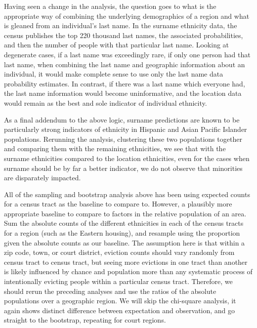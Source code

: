 \par Having seen a change in the analysis, the question goes to what is the appropriate way of combining the underlying demographics of a region and what is gleaned from an individual’s last name.  In the surname ethnicity data, the census publishes the top 220 thousand last names, the associated probabilities, and then the number of people with that particular last name.  Looking at degenerate cases, if a last name was exceedingly rare, if only one person had that last name, when combining the last name and geographic information about an individual, it would make complete sense to use only the last name data probability estimates.  In contrast, if there was a last name which everyone had, the last name information would become uninformative, and the location data would remain as the best and sole indicator of individual ethnicity.

\par As a final addendum to the above logic, surname predictions are known to be particularly strong indicators of ethnicity in Hispanic and Asian Pacific Islander populations.  Rerunning the analysis, clustering these two populations together and comparing them with the remaining ethnicities, we see that with the surname ethnicities compared to the location ethnicities, even for the cases when surname should be by far a better indicator, we do not observe that minorities are disparately impacted.

\par All of the sampling and bootstrap analysis above has been using expected counts for a census tract as the baseline to compare to.  However, a plausibly more appropriate baseline to compare to factors in the relative population of an area.  Sum the absolute counts of the different ethnicities in each of the census tracts for a region (such as the Eastern housing), and resample using the proportion given the absolute counts as our baseline.  The assumption here is that within a zip code, town, or court district, eviction counts should vary randomly from census tract to census tract, but seeing more evictions in one tract than another is likely influenced by chance and population more than any systematic process of intentionally evicting people within a particular census tract.  Therefore, we should rerun the preceding analyses and use the ratios of the absolute populations over a geographic region.  We will skip the chi-square analysis, it again shows distinct difference between expectation and observation, and go straight to the bootstrap, repeating for court regions.

